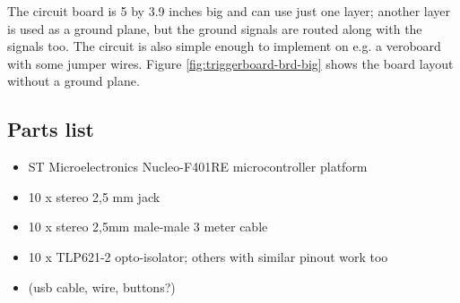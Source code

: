 The circuit board is 5 by 3.9 inches big and can use just one layer;
another layer is used as a ground plane, but the ground signals are routed along with the signals too.
The circuit is also simple enough to implement on e.g. a veroboard with some jumper wires.
Figure \ref{fig:triggerboard-brd-big} shows the board layout without a ground plane.

\subsection{Parts list}

\begin{itemize}
	\item ST Microelectronics Nucleo-F401RE microcontroller platform
	\item 10 x stereo 2,5 mm jack
	\item 10 x stereo 2,5mm male-male 3 meter cable
	\item 10 x TLP621-2 opto-isolator; others with similar pinout work too
	\item (usb cable, wire, buttons?)
\end{itemize}
